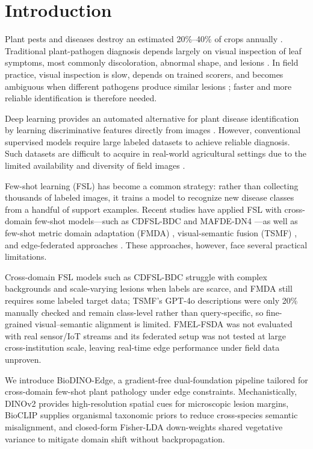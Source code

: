 \documentclass[conference]{IEEEtran}
\begin{document}
\section{Introduction}
Plant pests and diseases destroy an estimated 20\%--40\% of crops annually \cite{richard2022control}. Traditional plant-pathogen diagnosis depends largely on visual inspection of leaf symptoms, most commonly discoloration, abnormal shape, and lesions \cite{khakimov2022traditional}. In field practice, visual inspection is slow, depends on trained scorers, and becomes ambiguous when different pathogens produce similar lesions \cite{shoaib2023advanced}; faster and more reliable identification is therefore needed.

Deep learning provides an automated alternative for plant disease identification by learning discriminative features directly from images \cite{shoaib2023advanced}. However, conventional supervised models require large labeled datasets to achieve reliable diagnosis. Such datasets are difficult to acquire in real-world agricultural settings due to the limited availability and diversity of field images \cite{shoaib2023advanced, shafik2023systematic}.

Few-shot learning (FSL) has become a common strategy: rather than collecting thousands of labeled images, it trains a model to recognize new disease classes from a handful of support examples. Recent studies have applied FSL with cross-domain few-shot models---such as CDFSL-BDC \cite{yang2024laboratory} and MAFDE-DN4 \cite{zhao2024mafde}---as well as few-shot metric domain adaptation (FMDA) \cite{kudo2025few}, visual-semantic fusion (TSMF) \cite{zhou2026vsf}, and edge-federated approaches \cite{sharif2026real}. These approaches, however, face several practical limitations.

Cross-domain FSL models such as CDFSL-BDC \cite{yang2024laboratory} struggle with complex backgrounds and scale-varying lesions when labels are scarce, and FMDA \cite{kudo2025few} still requires some labeled target data; TSMF's \cite{zhou2026vsf} GPT-4o descriptions were only 20\% manually checked and remain class-level rather than query-specific, so fine-grained visual--semantic alignment is limited. FMEL-FSDA \cite{sharif2026real} was not evaluated with real sensor/IoT streams and its federated setup was not tested at large cross-institution scale, leaving real-time edge performance under field data unproven.

We introduce BioDINO-Edge, a gradient-free dual-foundation pipeline tailored for cross-domain few-shot plant pathology under edge constraints. Mechanistically, DINOv2 provides high-resolution spatial cues for microscopic lesion margins, BioCLIP supplies organismal taxonomic priors to reduce cross-species semantic misalignment, and closed-form Fisher-LDA down-weights shared vegetative variance to mitigate domain shift without backpropagation.
\end{document}
